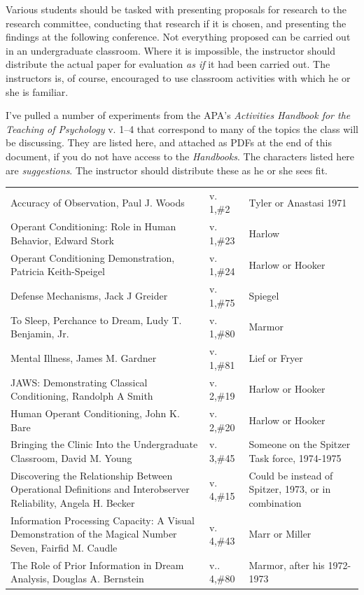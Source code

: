 \begin{refsection}
Various students should be tasked with presenting proposals for research to the research committee, conducting that research if it is chosen, and presenting the findings at the following conference. Not everything proposed can be carried out in an undergraduate classroom. Where it is impossible, the instructor should distribute the actual paper for evaluation \emph{as if} it had been carried out. The instructors is, of course, encouraged to use classroom activities with which he or she is familiar. 

I've pulled a number of experiments from the APA's \emph{Activities Handbook for the Teaching of Psychology} v. 1--4 that correspond to many of the topics the class will be discussing. They are listed here, and attached as PDFs at the end of this document, if you do not have access to the \emph{Handbooks}. The characters listed here are \emph{suggestions}. The instructor should distribute these as he or she sees fit.

 \begin{longtable}[!t]{ | P{7cm} | P{2.5cm} |   P{3cm} |}
\hline
{}&&\\ \hline
Accuracy of Observation, Paul J. Woods&v. 1,\#2&Tyler or Anastasi 1971\\
Operant Conditioning: Role in Human Behavior, Edward Stork&v. 1,\#23&Harlow\\
Operant Conditioning Demonstration, Patricia Keith-Speigel&v. 1,\#24&
Harlow or Hooker\\
Defense Mechanisms, Jack J Greider&v. 1,\#75&Spiegel\\
To Sleep, Perchance to Dream, Ludy T. Benjamin, Jr.&v. 1,\#80&Marmor\\
Mental Illness, James M. Gardner&v. 1,\#81&Lief or Fryer\\
JAWS: Demonstrating Classical Conditioning, Randolph A Smith&v. 2,\#19&Harlow or Hooker\\
Human Operant Conditioning, John K. Bare&v. 2,\#20&Harlow or Hooker\\
Bringing the Clinic Into the Undergraduate Classroom, David M. Young&v. 3,\#45&Someone on the Spitzer Task force, 1974-1975\\
Discovering the Relationship Between Operational Definitions and Interobserver Reliability, Angela H. Becker&v. 4,\#15&Could be instead of Spitzer, 1973, or in combination\\
Information Processing Capacity: A Visual Demonstration of the Magical Number Seven, Fairfid M. Caudle&v. 4,\#43&Marr or Miller\\
The Role of Prior Information in Dream Analysis, Douglas A. Bernstein&v.. 4,\#80&Marmor, after his 1972-1973\\ \hline


\end{longtable}
\end{refsection}
